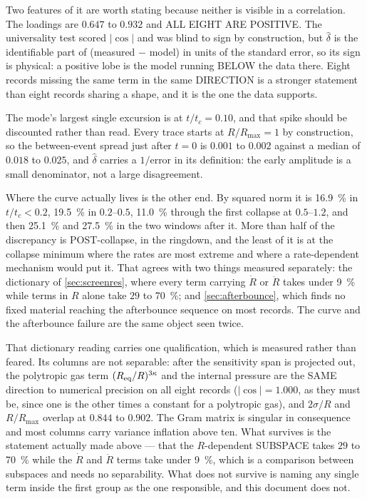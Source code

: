 \documentclass[10pt]{article}
\begin{document}
Two features of it are worth stating because neither is visible in a correlation. The loadings
are $0.647$ to $0.932$ and ALL EIGHT ARE POSITIVE. The universality test scored
$\lvert\cos\rvert$ and was blind to sign by construction, but $\hat\delta$ is the identifiable
part of (measured $-$ model) in units of the standard error, so its sign is physical: a positive
lobe is the model running BELOW the data there. Eight records missing the same term in the same
DIRECTION is a stronger statement than eight records sharing a shape, and it is the one the data
supports.

The mode's largest single excursion is at $t/t_c = 0.10$, and that spike should be discounted
rather than read. Every trace starts at $R/R_{\max} = 1$ by construction, so the between-event
spread just after $t=0$ is $0.001$ to $0.002$ against a median of $0.018$ to $0.025$, and
$\hat\delta$ carries a $1/\text{error}$ in its definition: the early amplitude is a small
denominator, not a large disagreement.

Where the curve actually lives is the other end. By squared norm it is \SI{16.9}{\percent} in
$t/t_c < 0.2$, \SI{19.5}{\percent} in $0.2$--$0.5$, \SI{11.0}{\percent} through the first
collapse at $0.5$--$1.2$, and then \SI{25.1}{\percent} and \SI{27.5}{\percent} in the two
windows after it. More than half of the discrepancy is POST-collapse, in the ringdown, and the
least of it is at the collapse minimum where the rates are most extreme and where a
rate-dependent mechanism would put it. That agrees with two things measured separately: the
dictionary of \cref{sec:screenres}, where every term carrying $\dot R$ or $\ddot R$ takes under
\SI{9}{\percent} while terms in $R$ alone take $29$ to \SI{70}{\percent}; and
\cref{sec:afterbounce}, which finds no fixed material reaching the afterbounce sequence on most
records. The curve and the afterbounce failure are the same object seen twice.

That dictionary reading carries one qualification, which is measured rather than feared. Its
columns are not separable: after the sensitivity span is projected out, the polytropic gas term
$(R_{\rm eq}/R)^{3\kappa}$ and the internal pressure are the SAME direction to numerical
precision on all eight records ($\lvert\cos\rvert = 1.000$, as they must be, since one is the
other times a constant for a polytropic gas), and $2\sigma/R$ and $R/R_{\max}$ overlap at
$0.844$ to $0.902$. The Gram matrix is singular in consequence and most columns carry variance
inflation above ten. What survives is the statement actually made above --- that the
$R$-dependent SUBSPACE takes $29$ to \SI{70}{\percent} while the $\dot R$ and $\ddot R$ terms
take under \SI{9}{\percent}, which is a comparison between subspaces and needs no separability.
What does not survive is naming any single term inside the first group as the one responsible,
and this document does not.
\end{document}
